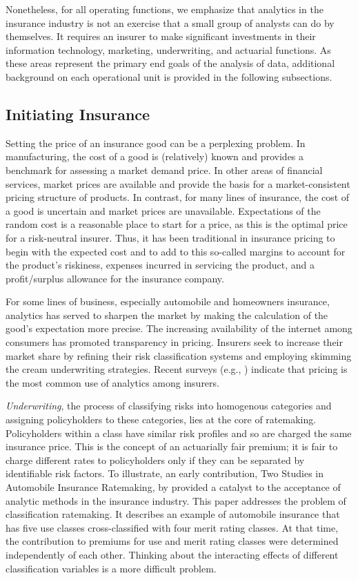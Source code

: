 \documentclass[]{book}
\theoremstyle{definition}
\theoremstyle{definition}
\theoremstyle{definition}
\theoremstyle{remark}
\begin{document}
Nonetheless, for all operating functions, we emphasize that analytics in
the insurance industry is not an exercise that a small group of analysts
can do by themselves. It requires an insurer to make significant
investments in their information technology, marketing, underwriting,
and actuarial functions. As these areas represent the primary end goals
of the analysis of data, additional background on each operational unit
is provided in the following subsections.

\subsection{Initiating Insurance}\label{initiating-insurance}

Setting the price of an insurance good can be a perplexing problem. In
manufacturing, the cost of a good is (relatively) known and provides a
benchmark for assessing a market demand price. In other areas of
financial services, market prices are available and provide the basis
for a market-consistent pricing structure of products. In contrast, for
many lines of insurance, the cost of a good is uncertain and market
prices are unavailable. Expectations of the random cost is a reasonable
place to start for a price, as this is the optimal price for a
risk-neutral insurer. Thus, it has been traditional in insurance pricing
to begin with the expected cost and to add to this so-called margins to
account for the product's riskiness, expenses incurred in servicing the
product, and a profit/surplus allowance for the insurance company.

For some lines of business, especially automobile and homeowners
insurance, analytics has served to sharpen the market by making the
calculation of the good's expectation more precise. The increasing
availability of the internet among consumers has promoted transparency
in pricing. Insurers seek to increase their market share by refining
their risk classification systems and employing skimming the cream
underwriting strategies. Recent surveys (e.g., \citep{survey2013})
indicate that pricing is the most common use of analytics among
insurers.

\emph{Underwriting}, the process of classifying risks into homogenous
categories and assigning policyholders to these categories, lies at the
core of ratemaking. Policyholders within a class have similar risk
profiles and so are charged the same insurance price. This is the
concept of an actuarially fair premium; it is fair to charge different
rates to policyholders only if they can be separated by identifiable
risk factors. To illustrate, an early contribution, Two Studies in
Automobile Insurance Ratemaking, by \citep{bailey1960} provided a
catalyst to the acceptance of analytic methods in the insurance
industry. This paper addresses the problem of classification ratemaking.
It describes an example of automobile insurance that has five use
classes cross-classified with four merit rating classes. At that time,
the contribution to premiums for use and merit rating classes were
determined independently of each other. Thinking about the interacting
effects of different classification variables is a more difficult
problem.
\end{document}
